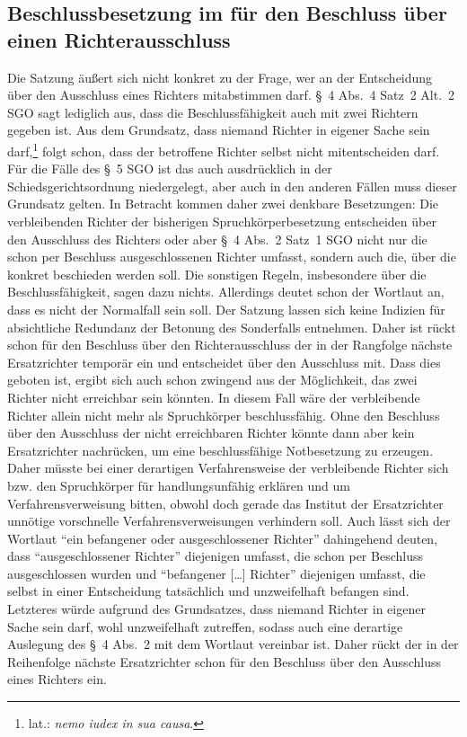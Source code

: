 \subsection{Beschlussbesetzung im für den Beschluss über einen Richterausschluss}
\label{Zusammensetzung:Spruchkoerper:Besetzungausschlussbeschluss}
Die Satzung äußert sich nicht konkret zu der Frage, wer an der Entscheidung über den Ausschluss eines Richters mitabstimmen darf.
\S~4 Abs.~4 Satz~2 Alt.~2 SGO sagt lediglich aus, dass die Beschlussfähigkeit auch mit zwei Richtern gegeben ist.
Aus dem Grundsatz, dass niemand Richter in eigener Sache sein darf,\footnote{lat.: \emph{nemo iudex in sua causa}.} folgt schon, dass der betroffene Richter selbst nicht mitentscheiden darf. Für die Fälle des \S~5 SGO ist das auch ausdrücklich in der Schiedsgerichtsordnung niedergelegt, aber auch in den anderen Fällen muss dieser Grundsatz gelten.
In Betracht kommen daher zwei denkbare Besetzungen: Die verbleibenden Richter der bisherigen Spruchkörperbesetzung entscheiden über den Ausschluss des Richters oder aber \S~4 Abs.~2 Satz~1 SGO nicht nur die schon per Beschluss ausgeschlossenen Richter umfasst, sondern auch die, über die konkret beschieden werden soll.
Die sonstigen Regeln, insbesondere über die Beschlussfähigkeit, sagen dazu nichts.
Allerdings deutet schon der Wortlaut  an, dass es nicht der Normalfall sein soll.
Der Satzung lassen sich keine Indizien für absichtliche Redundanz der Betonung des Sonderfalls entnehmen.
Daher ist rückt schon für den Beschluss über den Richterausschluss der in der Rangfolge nächste Ersatzrichter temporär ein und entscheidet über den Ausschluss mit.
Dass dies geboten ist, ergibt sich auch schon zwingend aus der Möglichkeit, das zwei Richter nicht erreichbar sein könnten.
In diesem Fall wäre der verbleibende Richter allein nicht mehr als Spruchkörper beschlussfähig.
Ohne den Beschluss über den Ausschluss der nicht erreichbaren Richter könnte dann aber kein Ersatzrichter nachrücken, um eine beschlussfähige Notbesetzung zu erzeugen.
Daher müsste bei einer derartigen Verfahrensweise der verbleibende Richter sich bzw. den Spruchkörper für handlungsunfähig erklären und um Verfahrensverweisung bitten, obwohl doch gerade das Institut der Ersatzrichter unnötige vorschnelle Verfahrensverweisungen verhindern soll.
Auch lässt sich der Wortlaut \enquote{ein befangener oder ausgeschlossener Richter} dahingehend deuten, dass \enquote{ausgeschlossener Richter} diejenigen umfasst, die schon per Beschluss ausgeschlossen wurden und \enquote{befangener […] Richter} diejenigen umfasst, die selbst in einer Entscheidung tatsächlich und unzweifelhaft befangen sind. Letzteres würde aufgrund des Grundsatzes, dass niemand Richter in eigener Sache sein darf, wohl unzweifelhaft zutreffen, sodass auch eine derartige Auslegung des \S~4 Abs.~2 mit dem Wortlaut vereinbar ist.
Daher rückt der in der Reihenfolge nächste Ersatzrichter schon für den Beschluss über den Ausschluss eines Richters ein.

